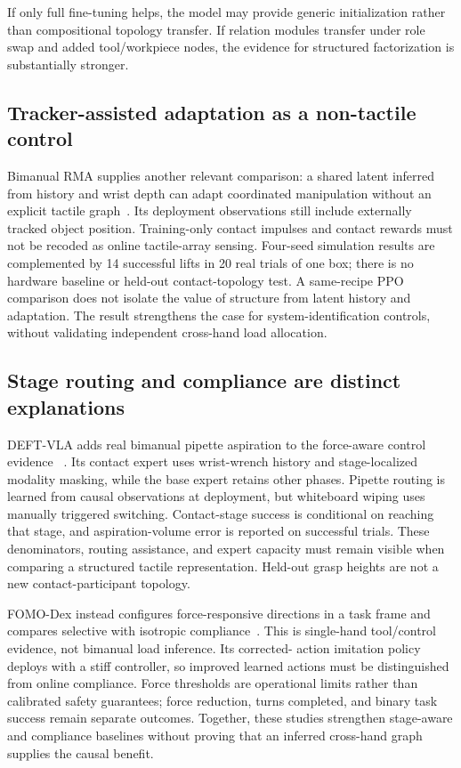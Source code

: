 If only full fine-tuning helps, the model may provide generic initialization rather
than compositional topology transfer. If relation modules transfer under role
swap and added tool/workpiece nodes, the evidence for structured factorization is
substantially stronger.

\subsection{Tracker-assisted adaptation as a non-tactile control}

Bimanual RMA supplies another relevant comparison: a shared latent inferred from
history and wrist depth can adapt coordinated manipulation without an explicit
tactile graph~\cite{joo2026bimanualrma}. Its deployment observations still include
externally tracked object position. Training-only contact impulses and contact
rewards must not be recoded as online tactile-array sensing. Four-seed simulation
results are complemented by 14 successful lifts in 20 real trials of one box;
there is no hardware baseline or held-out contact-topology test. A same-recipe
PPO comparison does not isolate the value of structure from latent history and
adaptation. The result strengthens the case for system-identification controls,
without validating independent cross-hand load allocation.

\subsection{Stage routing and compliance are distinct explanations}

DEFT-VLA adds real bimanual pipette aspiration to the force-aware control evidence
~\cite{huang2026deftvla}. Its contact expert uses wrist-wrench history and
stage-localized modality masking, while the base expert retains other phases.
Pipette routing is learned from causal observations at deployment, but whiteboard
wiping uses manually triggered switching. Contact-stage success is conditional
on reaching that stage, and aspiration-volume error is reported on successful
trials. These denominators, routing assistance, and expert capacity must remain
visible when comparing a structured tactile representation. Held-out grasp
heights are not a new contact-participant topology.

FOMO-Dex instead configures force-responsive directions in a task frame and
compares selective with isotropic compliance~\cite{yuan2026fomodex}. This is
single-hand tool/control evidence, not bimanual load inference. Its corrected-
action imitation policy deploys with a stiff controller, so improved learned
actions must be distinguished from online compliance. Force thresholds are
operational limits rather than calibrated safety guarantees; force reduction,
turns completed, and binary task success remain separate outcomes. Together,
these studies strengthen stage-aware and compliance baselines without proving
that an inferred cross-hand graph supplies the causal benefit.

